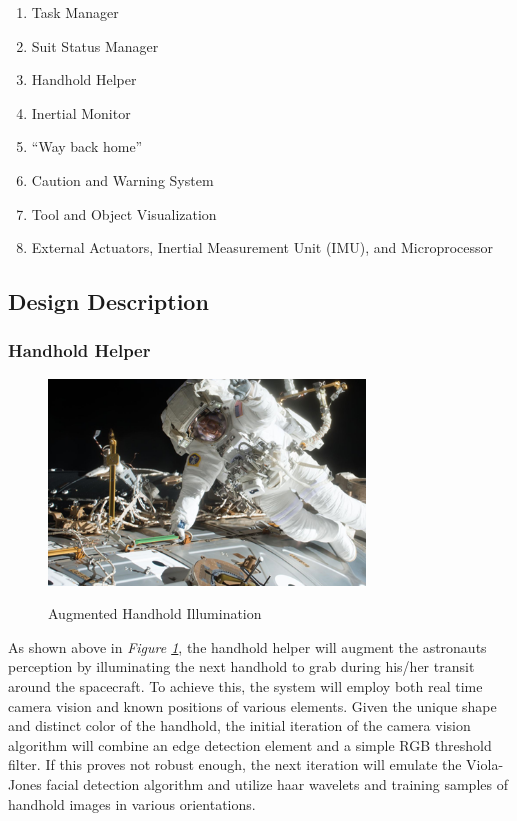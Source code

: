 \documentclass{article}
\let\Oldsubsection\subsection
\renewcommand{\subsection}{\FloatBarrier\Oldsubsection}
\let\Oldsubsubsection\subsubsection
\renewcommand{\subsubsection}{\FloatBarrier\Oldsubsubsection}
\begin{document}
\begin{enumerate}
\item Task Manager
\item Suit Status Manager
\item Handhold Helper
\item Inertial Monitor
\item “Way back home”
\item Caution and Warning System
\item Tool and Object Visualization
\item External Actuators, Inertial Measurement Unit (IMU), and Microprocessor
\end{enumerate}


\subsection{Design Description}

\subsubsection{Handhold Helper}

\begin{figure}[!htb]
  \centering
  \caption{Augmented Handhold Illumination}
  \includegraphics[width=0.75\textwidth]{assets/markedhandrail.png}
  \label{fig:markedhandrail}
\end{figure}

As shown above in \textit{Figure \ref{fig:markedhandrail}}, the handhold helper will augment the astronauts perception by illuminating the next handhold to grab during his/her transit around the spacecraft. To achieve this, the system will employ both real time camera vision and known positions of various elements. Given the unique shape and distinct color of the handhold, the initial iteration of the camera vision algorithm will combine an edge detection element and a simple RGB threshold filter. If this proves not robust enough, the next iteration will emulate the Viola-Jones facial detection algorithm and utilize haar wavelets and training samples of handhold images in various orientations.
\end{document}
